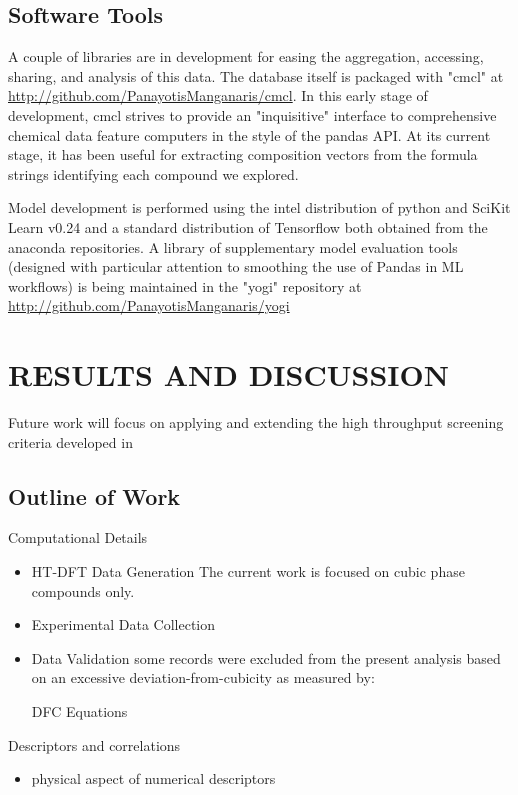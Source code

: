 \documentclass[aip, jmp, amsmath, amssymb]{revtex4-2}
\begin{document}
\subsection*{Software Tools}
\label{sec:org4cb238c}
A couple of libraries are in development for easing the aggregation,
accessing, sharing, and analysis of this data.  The database itself is
packaged with "cmcl" at \url{http://github.com/PanayotisManganaris/cmcl}.
In this early stage of development, cmcl strives to provide an
"inquisitive" interface to comprehensive chemical data feature
computers in the style of the pandas API. At its current stage, it has
been useful for extracting composition vectors from the formula
strings identifying each compound we explored.

Model development is performed using the intel distribution of python
and SciKit Learn v0.24 and a standard distribution of Tensorflow both
obtained from the anaconda repositories. A library of supplementary
model evaluation tools (designed with particular attention to
smoothing the use of Pandas in ML workflows) is being maintained in
the "yogi" repository at \url{http://github.com/PanayotisManganaris/yogi}

\section*{RESULTS AND DISCUSSION}
\label{sec:orgd6c0d83}
Future work will focus on applying and extending the high throughput
screening criteria developed in \cite{mannodi-kanakkithodi-2021-data-driven-new}


\subsection*{Outline of Work}
\label{sec:org49f050d}
Computational Details
\begin{itemize}
\item HT-DFT Data Generation
The current work is focused on cubic phase compounds only.
\item Experimental Data Collection
\item Data Validation
some records were excluded from the present analysis based on an
excessive deviation-from-cubicity as measured by:

DFC Equations
\end{itemize}

Descriptors and correlations
\begin{itemize}
\item physical aspect of numerical descriptors
\end{itemize}
\end{document}
